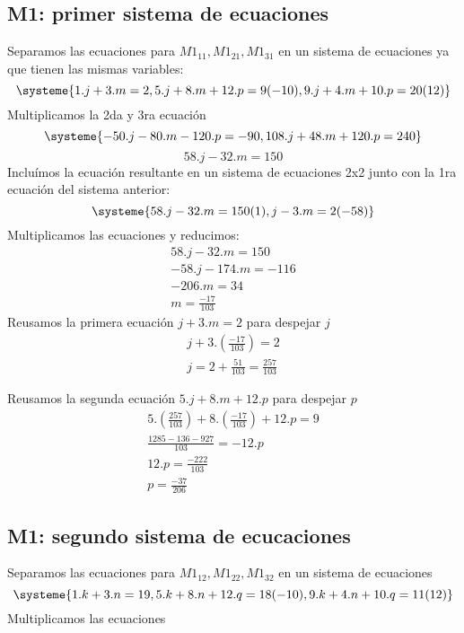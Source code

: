 \documentclass[11pt]{article}
\begin{document}
\subsection{M1: primer sistema de ecuaciones}
Separamos las ecuaciones para $M1_{11}, M1_{21}, M1_{31}$ en un sistema de ecuaciones ya que tienen las mismas variables:
\begin{equation*}
\systeme{
1.j + 3.m = 2,
5.j + 8.m + 12.p = 9 (-10),
9.j + 4.m + 10.p = 20 (12)
}
\end{equation*}
Multiplicamos la 2da y 3ra ecuación
\begin{equation*}
\systeme{-50.j - 80.m - 120.p = -90,
108.j + 48.m + 120.p = 240
}
\end{equation*}
\begin{equation*}
58.j - 32.m = 150
\end{equation*}
Incluímos la ecuación resultante en un sistema de ecuaciones 2x2 junto con la 1ra ecuación del sistema anterior:
\begin{equation*}
\systeme{
58.j - 32.m = 150 (1),
j - 3.m = 2(-58)
}
\end{equation*}
Multiplicamos las ecuaciones y reducimos:
\begin{align*}
58.j - 32.m = 150\\
-58.j - 174.m = -116\\
-206.m = 34\\
m = \frac{-17}{103}
\end{align*}
Reusamos la primera ecuación $j + 3.m = 2$ para despejar $j$
\begin{align*}
j + 3.(\frac{-17}{103}) = 2 \\
j = 2 + \frac{51}{103} = \frac{257}{103}
\end{align*}

Reusamos la segunda ecuación $5.j + 8.m + 12.p$ para despejar $p$
\begin{align*}
5.(\frac{257}{103}) + 8.(\frac{-17}{103}) + 12.p = 9\\
\frac{1285 - 136 - 927}{103} = -12 . p\\
12 . p = \frac{-222}{103}\\
p = \frac{-37}{206}
\end{align*}

\subsection{M1: segundo sistema de ecucaciones}
Separamos las ecuaciones para $M1_{12}, M1_{22}, M1_{32}$ en un sistema de ecuaciones
\begin{equation*}
\systeme{
1.k + 3.n = 19,
5.k + 8.n + 12.q = 18 (-10),
9.k + 4.n + 10.q = 11 (12)
}
\end{equation*}
Multiplicamos las ecuaciones
\end{document}
